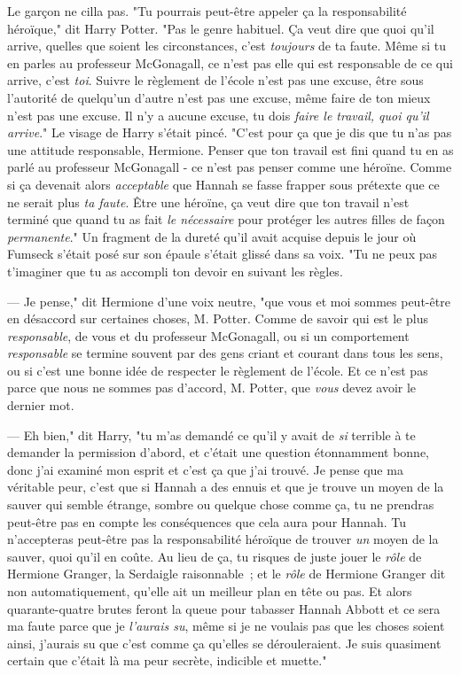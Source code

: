 Le garçon ne cilla pas. "Tu pourrais peut-être appeler ça la responsabilité héroïque," dit Harry Potter. "Pas le genre habituel. Ça veut dire que quoi qu'il arrive, quelles que soient les circonstances, c'est \emph{toujours} de ta faute. Même si tu en parles au professeur McGonagall, ce n'est pas elle qui est responsable de ce qui arrive, c'est \emph{toi}. Suivre le règlement de l'école n'est pas une excuse, être sous l'autorité de quelqu'un d'autre n'est pas une excuse, même faire de ton mieux n'est pas une excuse. Il n'y a aucune excuse, tu dois \emph{faire le travail, quoi qu'il arrive}." Le visage de Harry s'était pincé. "C'est pour ça que je dis que tu n'as pas une attitude responsable, Hermione. Penser que ton travail est fini quand tu en as parlé au professeur McGonagall - ce n'est pas penser comme une héroïne. Comme si ça devenait alors \emph{acceptable} que Hannah se fasse frapper sous prétexte que ce ne serait plus \emph{ta faute}. Être une héroïne, ça veut dire que ton travail n'est terminé que quand tu as fait \emph{le nécessaire} pour protéger les autres filles de façon \emph{permanente}." Un fragment de la dureté qu'il avait acquise depuis le jour où Fumseck s'était posé sur son épaule s'était glissé dans sa voix. "Tu ne peux pas t'imaginer que tu as accompli ton devoir en suivant les règles.

--- Je pense," dit Hermione d'une voix neutre, "que vous et moi sommes peut-être en désaccord sur certaines choses, M. Potter. Comme de savoir qui est le plus \emph{responsable}, de vous et du professeur McGonagall, ou si un comportement \emph{responsable} se termine souvent par des gens criant et courant dans tous les sens, ou si c'est une bonne idée de respecter le règlement de l'école. Et ce n'est pas parce que nous ne sommes pas d'accord, M. Potter, que \emph{vous} devez avoir le dernier mot.

--- Eh bien," dit Harry, "tu m'as demandé ce qu'il y avait de \emph{si} terrible à te demander la permission d'abord, et c'était une question étonnamment bonne, donc j'ai examiné mon esprit et c'est ça que j'ai trouvé. Je pense que ma véritable peur, c'est que si Hannah a des ennuis et que je trouve un moyen de la sauver qui semble étrange, sombre ou quelque chose comme ça, tu ne prendras peut-être pas en compte les conséquences que cela aura pour Hannah. Tu n'accepteras peut-être pas la responsabilité héroïque de trouver \emph{un} moyen de la sauver, quoi qu'il en coûte. Au lieu de ça, tu risques de juste jouer le \emph{rôle} de Hermione Granger, la Serdaigle raisonnable~; et le \emph{rôle} de Hermione Granger dit non automatiquement, qu'elle ait un meilleur plan en tête ou pas. Et alors quarante-quatre brutes feront la queue pour tabasser Hannah Abbott et ce sera ma faute parce que je \emph{l'aurais su}, même si je ne voulais pas que les choses soient ainsi, j'aurais su que c'est comme ça qu'elles se dérouleraient. Je suis quasiment certain que c'était là ma peur secrète, indicible et muette."


